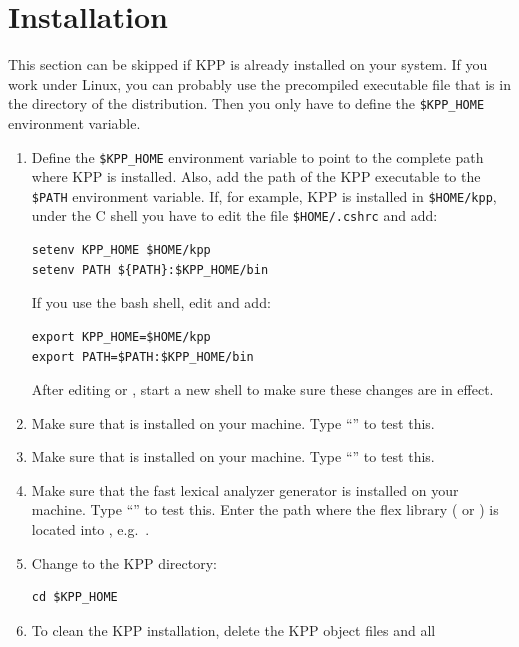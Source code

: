 \documentclass[twoside]{article}
\begin{document}
\tableofcontents\clearpage

\section{Installation}
\label{sec:install}

This section can be skipped if KPP is already installed on your system.
If you work under Linux, you can probably use the precompiled executable
file that is in the  directory of the distribution. Then you
only have to define the \verb|$KPP_HOME| environment variable.
%
\begin{enumerate}
\item Define the \verb|$KPP_HOME| environment variable to point to the
  complete path where KPP is installed. Also, add the path of the KPP
  executable to the \verb|$PATH| environment variable. If, for example,
  KPP is installed in \verb|$HOME/kpp|, under the C shell you have to
  edit the file \verb|$HOME/.cshrc| and add:
\begin{verbatim}
setenv KPP_HOME $HOME/kpp
setenv PATH ${PATH}:$KPP_HOME/bin
\end{verbatim} %
  If you use the bash shell, edit  and add: %
\begin{verbatim}
export KPP_HOME=$HOME/kpp
export PATH=$PATH:$KPP_HOME/bin
\end{verbatim} %
  After editing  or , start a new shell to
  make sure these changes are in effect.
\item Make sure that  is installed on your machine. Type
  ``'' to test this.
\item Make sure that  is installed on your machine. Type
  ``'' to test this.
\item Make sure that the fast lexical analyzer generator  is
  installed on your machine. Type ``'' to test
  this. Enter the path where the flex library ( or
  ) is located into , e.g.\
  .
\item Change to the KPP directory:
\begin{verbatim}
cd $KPP_HOME
\end{verbatim} %
\item To clean the KPP installation, delete the KPP object files and all

\end{enumerate}
\end{document}
